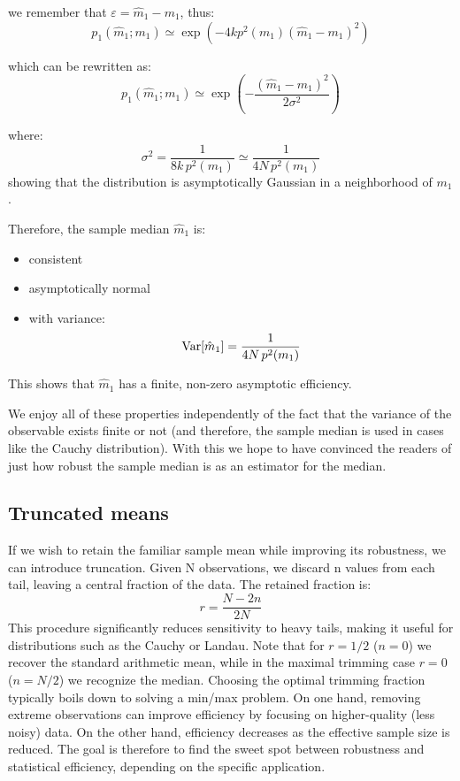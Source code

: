 we remember that $\varepsilon = \hat m_1 - m_1$, thus:
\[
p_1(\hat{m}_1; m_1)\simeq \exp\left(-4k p^2(m_1)(\hat m_1 - m_1)^2\right)
\]

which can be rewritten as:
\[
p_1(\hat{m}_1; m_1)\simeq \exp\left(-\frac{(\hat m_1 - m_1)^2}{2\sigma^2}\right)
\]

where: 
\[
\sigma^2 = \frac{1}{8k\,p^2(m_1)} \simeq \frac{1}{4N\,p^2(m_1)}
\]
showing that the distribution is asymptotically Gaussian in a neighborhood of $m_1$.

Therefore, the sample median $\hat{m}_1$ is:
\begin{itemize}
	\item consistent
	\item asymptotically normal
	\item with variance:
	\[
	\operatorname{Var}[\hat{m}_1] = \frac{1}{4N\,p^2(m_1)}
	\]
\end{itemize}

This shows that $\hat{m}_1$ has a finite, non-zero asymptotic efficiency.

We enjoy all of these properties independently of the fact that the variance of the observable exists finite or not (and therefore, the sample median is used in cases like the Cauchy distribution). With this we hope to have convinced the readers of just how robust the sample median is as an estimator for the median.

\subsection{Truncated means}

If we wish to retain the familiar sample mean while improving its robustness, we can introduce truncation. Given N observations, we discard n values from each tail, leaving a central fraction of the data. The retained fraction is:
\[
	r= \frac{N-2n}{2N}
\]
This procedure significantly reduces sensitivity to heavy tails, making it useful for distributions such as the Cauchy or Landau. Note that for $r=1/2$ ($n=0$) we recover the standard arithmetic mean, while in the maximal trimming case $r=0$ ($n=N/2$) we recognize the median. Choosing the optimal trimming fraction typically boils down to solving a min/max problem. On one hand, removing extreme observations can improve efficiency by focusing on higher-quality (less noisy) data. On the other hand, efficiency decreases as the effective sample size is reduced. The goal is therefore to find the sweet spot between robustness and statistical efficiency, depending on the specific application.

